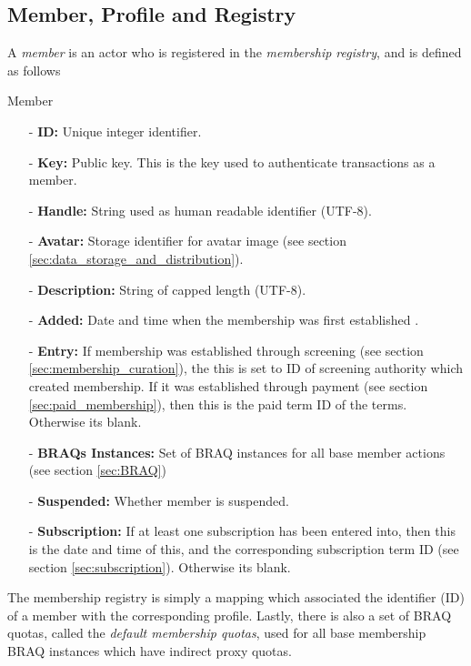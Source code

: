 \documentclass{article}
\newenvironment{concept_box}[1]
    {
    \begin{tcolorbox}
    {\large \textbf{#1} }
    }
    {
    \end{tcolorbox}
    }
\begin{document}
\subsection{Member, Profile and Registry} \label{sec:member_profile}

A \textit{member} is an actor who is registered in the \textit{membership registry}, and is defined as follows \\

\begin{concept_box}{Member}
    \begin{itemize}
      \item[-] \textbf{ID:} Unique integer identifier.
      \item[-] \textbf{Key:} Public key. This is the key used to authenticate transactions as a member. %
      \item[-] \textbf{Handle:} String used as human readable identifier (UTF-8).
      \item[-] \textbf{Avatar:} Storage identifier for avatar image (see section \ref{sec:data_storage_and_distribution}).
      \item[-] \textbf{Description:} String of capped length (UTF-8).

      \item[-] \textbf{Added:} Date and time when the membership was first established .
      \item[-] \textbf{Entry:} If membership was established through screening (see section \ref{sec:membership_curation}), the this is set to ID of screening authority which created membership. If it was established through payment (see section \ref{sec:paid_membership}), then this is the paid term ID of the terms. Otherwise its blank.
      \item[-] \textbf{BRAQs Instances:} Set of BRAQ instances for all base member actions (see section \ref{sec:BRAQ})
      \item[-] \textbf{Suspended:} Whether member is suspended.
      \item[-] \textbf{Subscription:} If at least one subscription has been entered into, then this is the date and time of this, and the corresponding subscription term ID (see section \ref{sec:subscription}). Otherwise its blank.
    \end{itemize}
\end{concept_box}

The membership registry is simply a mapping which associated the identifier (ID) of a member with the corresponding profile. Lastly, there is also a set of BRAQ quotas, called the \textit{default membership quotas}, used for all base membership BRAQ instances which have indirect proxy quotas.
\end{document}
